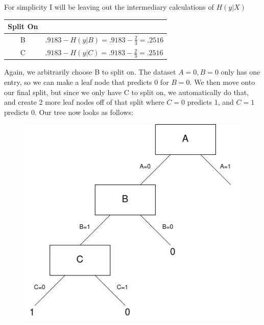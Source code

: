 \documentclass{article}
\begin{document}
        \qquad For simplicity I will be leaving out the intermediary calculations of $H(y | X)$
        \begin{center}
            \begin{tabular}{c | l}
                Split On & \\
                \hline
                B & $.9183 - H(y | B) = .9183 - \frac{2}{3} = .2516$\\
                C & $.9183 - H(y | C) = .9183 - \frac{2}{3} = .2516$\\
            \end{tabular}
        \end{center}
        \qquad Again, we arbitrarily choose B to split on. The dataset $A=0, B=0 $ only has one entry, so we can make a leaf node that predicts 0 for $B = 0$. 
        We then move onto our final split, but since we only have C to split on, we automatically do that, and create 2 more leaf nodes off of that split where $C = 0$ predicts 1, and $C=1$ predicts 0.
        Our tree now looks as follows: 
        \begin{figure}[h]
            \centering
            \includegraphics[width=.5\textwidth]{"Q2_1.png"}
        \end{figure}
\end{document}
